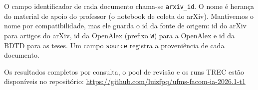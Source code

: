\documentclass[12pt]{article}
\begin{document}
O campo identificador de cada documento chama-se \texttt{arxiv\_id}. O nome é herança do material de apoio do professor (o notebook de coleta do arXiv). Mantivemos o nome por compatibilidade, mas ele guarda o id da fonte de origem: id do arXiv para artigos do arXiv, id da OpenAlex (prefixo \texttt{W}) para a OpenAlex e id da BDTD para as teses. Um campo \texttt{source} registra a proveniência de cada documento.

\vspace{1em}
{\small Os resultados completos por consulta, o pool de revisão e os runs TREC estão disponíveis no repositório: \url{https://github.com/luizfpq/ufms-facom-ia-2026.1-t1}}
\end{document}
